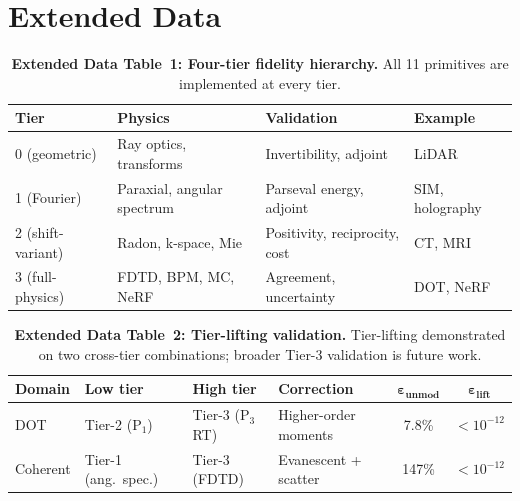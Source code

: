 \documentclass[11pt,a4paper]{article}
\newcommand{\eps}{\varepsilon}
\begin{document}
\section*{Extended Data}

\begin{table}[htbp]
\centering
\caption{\textbf{Extended Data Table~1: Four-tier fidelity hierarchy.}  All 11 primitives are implemented at every tier.}
\label{tab:tiers}
\footnotesize
\begin{tabularx}{\textwidth}{@{}llXl@{}}
\toprule
\textbf{Tier} & \textbf{Physics} & \textbf{Validation} & \textbf{Example} \\
\midrule
0 (geometric) & Ray optics, transforms & Invertibility, adjoint & LiDAR \\
1 (Fourier) & Paraxial, angular spectrum & Parseval energy, adjoint & SIM, holography \\
2 (shift-variant) & Radon, k-space, Mie & Positivity, reciprocity, cost & CT, MRI \\
3 (full-physics) & FDTD, BPM, MC, NeRF & Agreement, uncertainty & DOT, NeRF \\
\bottomrule
\end{tabularx}
\end{table}

\begin{table}[htbp]
\centering
\caption{\textbf{Extended Data Table~2: Tier-lifting validation.}  Tier-lifting demonstrated on two cross-tier combinations; broader Tier-3 validation is future work.}
\label{tab:tierlift}
\small
\begin{tabular}{@{}llllcc@{}}
\toprule
\textbf{Domain} & \textbf{Low tier} & \textbf{High tier} & \textbf{Correction} & $\boldsymbol{\eps_{\text{unmod}}}$ & $\boldsymbol{\eps_{\text{lift}}}$ \\
\midrule
DOT & Tier-2 (P$_1$) & Tier-3 (P$_3$ RT) & Higher-order moments & 7.8\% & $<10^{-12}$ \\
Coherent & Tier-1 (ang.\ spec.) & Tier-3 (FDTD) & Evanescent + scatter & 147\% & $<10^{-12}$ \\
\bottomrule
\end{tabular}
\end{table}
\end{document}
